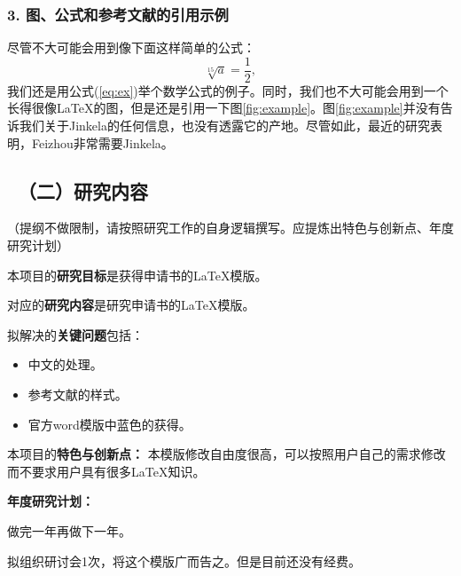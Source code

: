 \documentclass[12pt,UTF8,AutoFakeBold=2,a4paper]{ctexart} %
\newcommand{\sihao}{\fontsize{14pt}{\baselineskip}\selectfont}
\begin{document}
	\subsubsection{3. 图、公式和参考文献的引用示例}
	尽管不大可能会用到像下面这样简单的公式：
	\begin{equation}
		\label{eq:ex}
		\sqrt[15]{a}=\frac{1}{2},
	\end{equation}
	我们还是用公式(\ref{eq:ex})举个数学公式的例子。同时，我们也不大可能会用到一个长得很像\LaTeX 的图，但是还是引用一下图\ref{fig:example}。图\ref{fig:example}并没有告诉我们关于Jinkela\cite{John1997,Smith1900}的任何信息，也没有透露它的产地\cite{Piter1992,grif1998}。尽管如此，最近的研究表明，Feizhou非常需要Jinkela\cite{John1997}。
	
	
	{
		
		}
	\newpage
	
	\vskip -5mm %
	
	{\color{MsBlue} \subsection{\sihao \kaishu \quad \ （二）研究内容 }}
	\vskip -2mm
	{\sihao \color{MsBlue} \kaishu （提纲不做限制，请按照研究工作的自身逻辑撰写。应提炼出特色与创新点、年度研究计划）}
	
	本项目的{\bfseries 研究目标}是获得申请书的\LaTeX 模版。
	
	对应的{\bfseries 研究内容}是研究申请书的\LaTeX 模版。
	
	拟解决的{\bfseries 关键问题}包括：
	
	\begin{itemize}
		\item 中文的处理。
		\item 参考文献\cite{John1997,Smith1900,Piter1992}的样式。
		\item 官方word模版中蓝色的获得。
	\end{itemize}
	
	本项目的{\bfseries 特色与创新点：} 本模版修改自由度很高，可以按照用户自己的需求修改而不要求用户具有很多\LaTeX 知识。
	
	{\bfseries 年度研究计划：}
	
	做完一年再做下一年。 
	
	拟组织研讨会1次，将这个模版广而告之。但是目前还没有经费。
	
\end{document}
